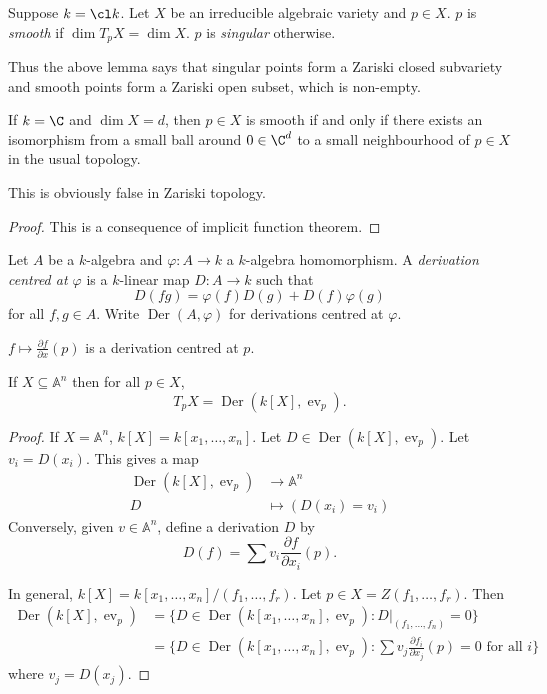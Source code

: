 \documentclass[a4paper]{article}
\renewcommand{\A}{\mathbb{A}}
\DeclareMathOperator{\ev}{ev}
\DeclareMathOperator{\Der}{Der} %
\begin{document}
\begin{definition}
  Suppose \(k = \cl k\). Let \(X\) be an irreducible algebraic variety and \(p \in X\). \(p\) is \emph{smooth} if \(\dim T_pX = \dim X\). \(p\) is \emph{singular} otherwise.
\end{definition}

Thus the above lemma says that singular points form a Zariski closed subvariety and smooth points form a Zariski open subset, which is non-empty.

\begin{proposition}[nonexaminable]
  If \(k = \C\) and \(\dim X = d\), then \(p \in X\) is smooth if and only if there exists an isomorphism from a small ball around \(0 \in \C^d\) to a small neighbourhood of \(p \in X\) in the usual topology.
\end{proposition}

This is obviously false in Zariski topology.

\begin{proof}
  This is a consequence of implicit function theorem.
\end{proof}

\begin{definition}[derivation]
  Let \(A\) be a \(k\)-algebra and \(\varphi: A \to k\) a \(k\)-algebra homomorphism. A \emph{derivation centred at \(\varphi\)} is a \(k\)-linear map \(D: A \to k\) such that
  \[
    D(fg) = \varphi(f) D(g) + D(f) \varphi(g)
  \]
  for all \(f, g \in A\). Write \(\Der(A, \varphi)\) for derivations centred at \(\varphi\).
\end{definition}

\begin{eg}
  \(f \mapsto \frac{\partial f}{\partial x}(p)\) is a derivation centred at \(p\).
\end{eg}

\begin{lemma}
  If \(X \subseteq \A^n\) then for all \(p \in X\),
  \[
    T_pX = \Der(k[X], \ev_p).
  \]
\end{lemma}

\begin{proof}
  If \(X = \A^n\), \(k[X] = k[x_1, \dots, x_n]\). Let \(D \in \Der(k[X], \ev_p)\). Let \(v_i = D(x_i)\). This gives a map
  \begin{align*}
    \Der(k[X], \ev_p) &\to \A^n \\
    D &\mapsto (D(x_i) = v_i)
  \end{align*}
  Conversely, given \(v \in \A^n\), define a derivation \(D\) by
  \[
    D(f) = \sum v_i \frac{\partial f}{\partial x_i}(p).
  \]

  In general, \(k[X] = k[x_1, \dots, x_n]/(f_1, \dots, f_r)\). Let \(p \in X = Z(f_1, \dots, f_r)\). Then
  \begin{align*}
    \Der(k[X], \ev_p)
    &= \{D \in \Der(k[x_1, \dots, x_n], \ev_p): D|_{(f_1, \dots, f_n)} = 0\} \\
    &= \{D \in \Der(k[x_1, \dots, x_n], \ev_p): \sum v_j \frac{\partial f_i}{\partial x_j}(p) = 0 \text{ for all } i\}
  \end{align*}
  where \(v_j = D(x_j)\).
\end{proof}
\end{document}
